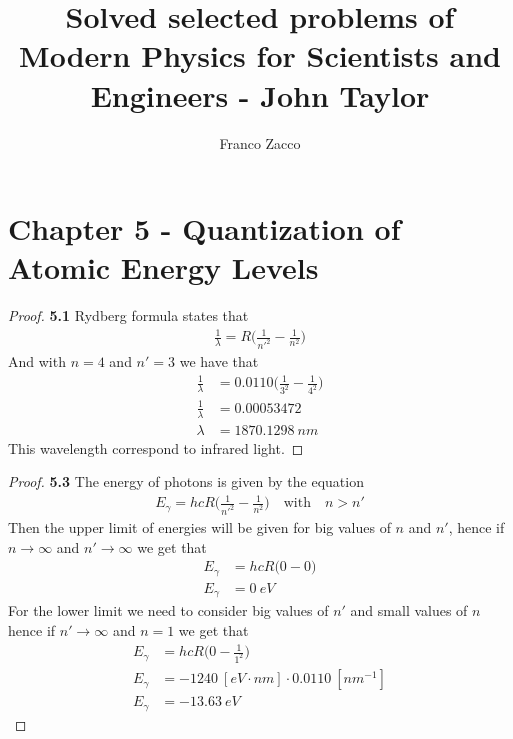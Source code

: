 \documentclass[11pt]{article}
\title{\textbf{Solved selected problems of Modern Physics for Scientists and Engineers - John Taylor}}
\author{Franco Zacco}
\date{}
\theoremstyle{definition}
\begin{document}
\maketitle
\thispagestyle{empty}

\section*{Chapter 5 - Quantization of Atomic Energy Levels}

\begin{proof}{\textbf{5.1}}
    Rydberg formula states that
    \begin{align*}
        \frac{1}{\lambda} = R\bigg(\frac{1}{n'^2} - \frac{1}{n^2}\bigg)
    \end{align*}
    And with $n = 4$ and $n' = 3$ we have that
    \begin{align*}
        \frac{1}{\lambda} &= 0.0110\bigg(\frac{1}{3^2} - \frac{1}{4^2}\bigg)\\
        \frac{1}{\lambda} &= 0.00053472\\
        \lambda &= 1870.1298~nm 
    \end{align*}
    This wavelength correspond to infrared light.
\end{proof}
\begin{proof}{\textbf{5.3}}
    The energy of photons is given by the equation
    \begin{align*}
        E_\gamma = hcR\bigg(\frac{1}{n'^2} - \frac{1}{n^2}\bigg)
        \quad \text{with} \quad n > n'
    \end{align*}
    Then the upper limit of energies will be given for big values of $n$ and
    $n'$, hence if $n \to \infty$ and $n' \to \infty$ we get that
    \begin{align*}
        E_\gamma &= hcR\bigg(0 - 0\bigg)\\
        E_\gamma &= 0~eV
    \end{align*}
    For the lower limit we need to consider big values of $n'$ and small
    values of $n$ hence if $n' \to \infty$ and $n = 1$ we get that
    \begin{align*}
        E_\gamma &= hcR\bigg(0 - \frac{1}{1^2}\bigg)\\
        E_\gamma &= -1240~[eV\cdot nm] \cdot 0.0110~[nm^{-1}]\\
        E_\gamma &= -13.63~eV
    \end{align*}
\end{proof}
\cleardoublepage
\end{document}

